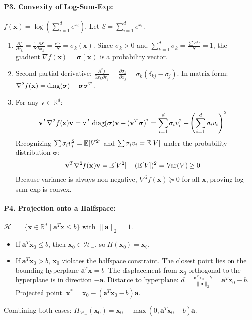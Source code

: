 \paragraph{P3. Convexity of Log-Sum-Exp:}
$f(\mathbf{x}) = \log\left(\sum_{i=1}^d e^{x_i}\right)$. Let $S = \sum_{i=1}^d e^{x_i}$.
\begin{enumerate}[label=(\alph*)]
    \item $\frac{\partial f}{\partial x_k} = \frac{1}{S} \frac{\partial S}{\partial x_k} = \frac{e^{x_k}}{S} = \sigma_k(\mathbf{x})$.
    Since $\sigma_k > 0$ and $\sum_{k=1}^d \sigma_k = \frac{\sum e^{x_k}}{S} = 1$, the gradient $\nabla f(\mathbf{x}) = \boldsymbol{\sigma}(\mathbf{x})$ is a probability vector.
    \item Second partial derivative:
    $\frac{\partial^2 f}{\partial x_k \partial x_j} = \frac{\partial \sigma_k}{\partial x_j} = \sigma_k (\delta_{kj} - \sigma_j)$.
    In matrix form: $\nabla^2 f(\mathbf{x}) = \operatorname{diag}(\boldsymbol{\sigma}) - \boldsymbol{\sigma}\boldsymbol{\sigma}^T$.
    \item For any $\mathbf{v} \in \mathbb{R}^d$:
    \begin{equation*}
    \mathbf{v}^T \nabla^2 f(\mathbf{x})\mathbf{v} = \mathbf{v}^T \operatorname{diag}(\boldsymbol{\sigma})\mathbf{v} - (\mathbf{v}^T \boldsymbol{\sigma})^2 = \sum_{i=1}^d \sigma_i v_i^2 - \left( \sum_{i=1}^d \sigma_i v_i \right)^2
    \end{equation*}
    Recognizing $\sum \sigma_i v_i^2 = \operatorname{\mathbb{E}}[V^2]$ and $\sum \sigma_i v_i = \operatorname{\mathbb{E}}[V]$ under the probability distribution $\boldsymbol{\sigma}$:
    \begin{equation*}
    \mathbf{v}^T \nabla^2 f(\mathbf{x})\mathbf{v} = \operatorname{\mathbb{E}}[V^2] - (\operatorname{\mathbb{E}}[V])^2 = \operatorname{Var}(V) \ge 0
    \end{equation*}
    Because variance is always non-negative, $\nabla^2 f(\mathbf{x}) \succeq 0$ for all $\mathbf{x}$, proving log-sum-exp is convex.
\end{enumerate}

\paragraph{P4. Projection onto a Halfspace:}
$\mathcal{H}_- = \{\mathbf{x} \in \mathbb{R}^d \mid \mathbf{a}^T \mathbf{x} \le b\}$ with $\|\mathbf{a}\|_2 = 1$.
\begin{itemize}
    \item If $\mathbf{a}^T \mathbf{x}_0 \le b$, then $\mathbf{x}_0 \in \mathcal{H}_-$, so $\Pi(\mathbf{x}_0) = \mathbf{x}_0$.
    \item If $\mathbf{a}^T \mathbf{x}_0 > b$, $\mathbf{x}_0$ violates the halfspace constraint. The closest point lies on the bounding hyperplane $\mathbf{a}^T \mathbf{x} = b$. The displacement from $\mathbf{x}_0$ orthogonal to the hyperplane is in direction $-\mathbf{a}$.
    Distance to hyperplane: $d = \frac{\mathbf{a}^T \mathbf{x}_0 - b}{\|\mathbf{a}\|_2} = \mathbf{a}^T \mathbf{x}_0 - b$.
    Projected point: $\mathbf{x}^* = \mathbf{x}_0 - (\mathbf{a}^T \mathbf{x}_0 - b)\mathbf{a}$.
\end{itemize}
Combining both cases: $\Pi_{\mathcal{H}_-}(\mathbf{x}_0) = \mathbf{x}_0 - \max(0, \mathbf{a}^T \mathbf{x}_0 - b)\mathbf{a}$.

